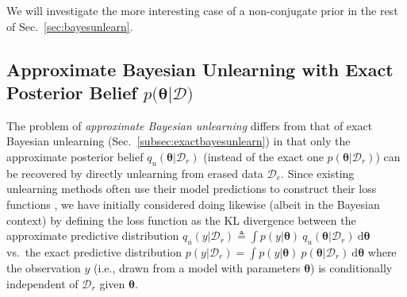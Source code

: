 \documentclass{article}
\theoremstyle{definition}
\newcommand{\mbf}[1]{\mathbf{#1}}
\newcommand{\mcl}[1]{\mathcal{#1}}
\newcommand{\mbb}[1]{\mathbb{#1}}
\newcommand{\da}{\mcl{D}}
\newcommand{\dc}{\mcl{D}_r}
\newcommand{\dr}{\mcl{D}_e}
\begin{document}
We will investigate the more interesting case of a non-conjugate prior in the rest of Sec.~\ref{sec:bayesunlearn}.%
%
%
\subsection{Approximate Bayesian Unlearning with Exact Posterior Belief
$p($\texorpdfstring{$\bm{\theta}$}{theta}$|\da)$}
\label{subsec:exactfull}%
%
The problem of \emph{approximate Bayesian unlearning} differs from that of exact Bayesian unlearning (Sec.~\ref{subsec:exactbayesunlearn}) in that only the approximate posterior belief $q_u(\bm{\theta}|\dc)$ (instead of the exact one $p(\bm{\theta}|\dc)$) can be recovered by directly unlearning from erased data $\dr$.
Since existing unlearning methods often use their model predictions to construct their loss functions \cite{bourtoule2019machine,cao2015towards,ginart2019making,guo2019certified}, we have initially considered doing likewise (albeit in the Bayesian context) by defining the loss function
as the KL divergence between the approximate predictive distribution $q_u(y|\dc) \triangleq %
\int p(y|\bm{\theta})\ q_u(\bm{\theta}|\dc)\  \text{d}\bm{\theta}$ vs.~the exact predictive distribution
$p(y|\dc) = %
\int p(y|\bm{\theta})\ p(\bm{\theta}|\dc)\  \text{d}\bm{\theta}$ where the observation $y$ (i.e., drawn from a model with parameters $\bm{\theta}$) is conditionally independent of $\dc$ given $\bm{\theta}$.
%
\end{document}
